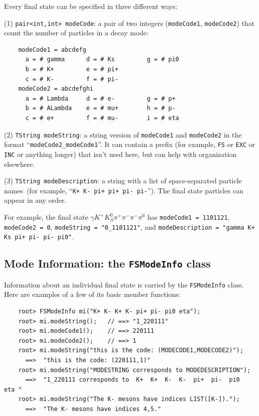 \documentclass[11pt]{article}
\begin{document}
Every final state can be specified in three different ways:

(1) {\tt pair<int,int> modeCode}: a pair of two integers ({\tt modeCode1}, {\tt modeCode2}) that count the number of particles in a decay mode:
\begin{verbatim}
    modeCode1 = abcdefg
      a = # gamma      d = # Ks         g = # pi0
      b = # K+         e = # pi+
      c = # K-         f = # pi-
    modeCode2 = abcdefghi
      a = # Lambda     d = # e-         g = # p+
      b = # ALambda    e = # mu+        h = # p-
      c = # e+         f = # mu-        i = # eta
\end{verbatim}
(2) {\tt TString modeString}: a string version of {\tt modeCode1} and {\tt modeCode2} in the format ``{\tt modeCode2\_modeCode1}''.  It can contain a prefix (for example, {\tt FS} or {\tt EXC} or {\tt INC} or anything longer) that isn't used here, but can help with organization elsewhere.  

(3) {\tt TString modeDescription}: a string with a list of space-separated particle names~(for example, ``{\tt K+ K- pi+ pi+ pi- pi-}'').  The final state particles can appear in any order. 

For example, the final state $\gamma K^+ K^0_S \pi^+ \pi^- \pi^- \pi^0$ has {\tt modeCode1 = 1101121}, {\tt modeCode2 = 0}, {\tt modeString = "0\_1101121"}, and {\tt modeDescription = "gamma K+ Ks pi+ pi- pi- pi0"}. 

\subsection{Mode Information: the {\tt FSModeInfo} class}
\label{sec:modeinfo}

Information about an individual final state is carried by the {\tt FSModeInfo} class.  Here are examples of a few of its basic member functions:
\begin{verbatim}
    root> FSModeInfo mi("K+ K- K+ K- pi+ pi- pi0 eta");
    root> mi.modeString();   // ==> "1_220111"
    root> mi.modeCode1();    // ==> 220111
    root> mi.modeCode2();    // ==> 1
    root> mi.modeString("this is the code: (MODECODE1,MODECODE2)");
      ==>  "this is the code: (220111,1)" 
    root> mi.modeString("MODESTRING corresponds to MODEDESCRIPTION");
      ==>  "1_220111 corresponds to  K+  K+  K-  K-  pi+  pi-  pi0  eta "
    root> mi.modeString("The K- mesons have indices LIST([K-]).");
      ==>  "The K- mesons have indices 4,5."
\end{verbatim}
\end{document}
